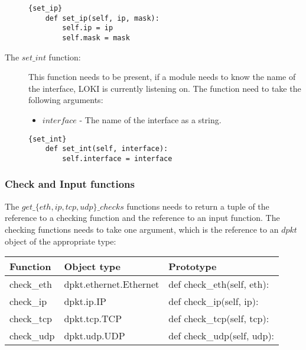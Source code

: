 \documentclass[a4paper, 11pt]{article}
\begin{document}
\begin{description}
                    \begin{lstlisting}[caption=Get the interface's IP]{set_ip}
    def set_ip(self, ip, mask):
        self.ip = ip
        self.mask = mask
                    \end{lstlisting}
                    
                    \item[The $set\_int$ function:] This function needs to be present, if a module needs to know the name of the interface, LOKI is currently listening on. The function need to take the following arguments:
                        \begin{itemize}
                            \item $interface$ - The name of the interface as a string.
                        \end{itemize}
                        
                    \begin{lstlisting}[caption=Get the interface]{set_int}
    def set_int(self, interface):
        self.interface = interface
                    \end{lstlisting}
                \end{description}
                
            \subsubsection{Check and Input functions}
            \label{check-input-func}

                The $get\_\{eth,ip,tcp,udp\}\_checks$ functions needs to return a tuple of the reference to a checking function and the reference to an input function. The checking functions needs to take one argument, which is the reference to an $dpkt$ object of the appropriate type:
                \\
                
                \begin{tabular}{|l|l|l|}
                    \hline
                    Function & Object type & Prototype\\
                    \hline
                    \hline
                    check\_eth & dpkt.ethernet.Ethernet & def check\_eth(self, eth):\\
                    check\_ip & dpkt.ip.IP & def check\_ip(self, ip):\\
                    check\_tcp & dpkt.tcp.TCP & def check\_tcp(self, tcp):\\
                    check\_udp & dpkt.udp.UDP & def check\_udp(self, udp):\\
                    \hline
                \end{tabular}
                \\
                
\end{document}
